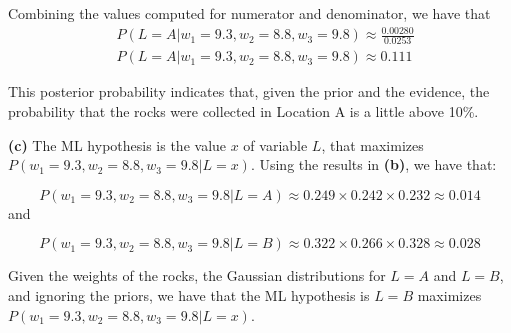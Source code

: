 \documentclass[leqno]{article}
\begin{document}
\noindent Combining the values computed for numerator and denominator, we have that
\begin{equation*}
\begin{split}
&P(L = A| w_1 = 9.3, w_2 = 8.8, w_3 = 9.8) \approx \frac{0.00280}{0.0253}
\\
&P(L = A| w_1 = 9.3, w_2 = 8.8, w_3 = 9.8) \approx 0.111
\end{split}
\end{equation*}

\noindent This posterior probability indicates that, given the prior and the evidence, the probability that the rocks were collected in Location A is a little above 10\%.

\noindent \textbf{(c)} The ML hypothesis is the value $x$ of variable $L$, that maximizes $P(w_1 = 9.3, w_2 = 8.8, w_3 = 9.8| L = x)$. Using the results in
\textbf{(b)}, we have that:

\begin{equation*}
P(w_1 = 9.3, w_2 = 8.8, w_3 = 9.8| L = A) \approx 0.249 \times 0.242 \times 0.232 \approx 0.014
\end{equation*}
and

\begin{equation*}
P(w_1 = 9.3, w_2 = 8.8, w_3 = 9.8| L = B) \approx 0.322 \times 0.266 \times 0.328 \approx 0.028
\end{equation*}

\noindent Given the weights of the rocks, the Gaussian distributions for $L = A$ and $L = B$, and ignoring the priors, we have that
the ML hypothesis is $L = B$ maximizes $P(w_1 = 9.3, w_2 = 8.8, w_3 = 9.8| L = x)$.
  
\end{document}
